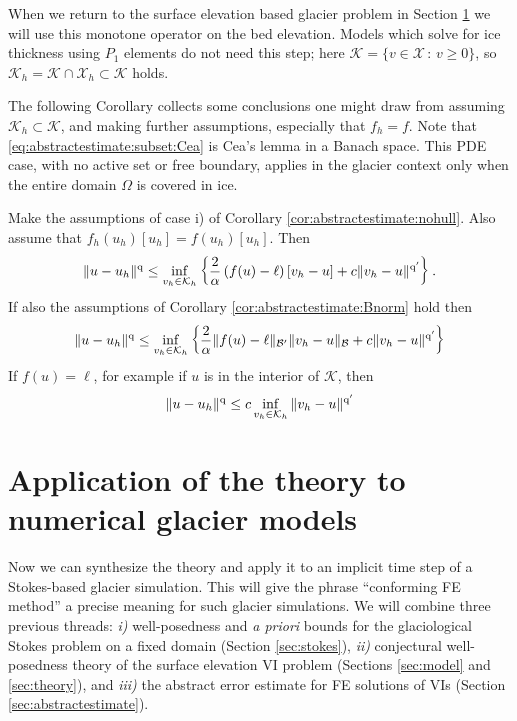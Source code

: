 \documentclass[hidelinks,onefignum,onetabnum,final]{siamart220329}  %
\newcommand{\cB}{\mathcal{B}}
\newcommand{\cK}{\mathcal{K}}
\newcommand{\cX}{\mathcal{X}}
\newcommand{\qq}{{\text{\textnormal{q}}}}
\begin{document}
When we return to the surface elevation based glacier problem in Section \ref{sec:application} we will use this monotone operator on the bed elevation.  Models which solve for ice thickness using $P_1$ elements do not need this step; here $\cK = \{v\in\cX\,:\,v\ge 0\}$, so $\cK_h=\cK\cap\cX_h \subset \cK$ holds.

The following Corollary collects some conclusions one might draw from assuming $\cK_h \subset \cK$, and making further assumptions, especially that $f_h=f$.  Note that \eqref{eq:abstractestimate:subset:Cea} is Cea's lemma \cite[Theorem 2.4.1]{Ciarlet2002} in a Banach space.  This PDE case, with no active set or free boundary, applies in the glacier context only when the entire domain $\Omega$ is covered in ice.

\begin{corollary}  \label{cor:abstractestimate:various}  Make the assumptions of case i) of Corollary \ref{cor:abstractestimate:nohull}.  Also assume that $f_h(u_h)[u_h] = f(u_h)[u_h]$.  Then
\begin{equation}
\|u-u_h\|^\qq \le  \inf_{v_h\in\cK_h} \left\{\frac{2}{\alpha} \left(f(u)-\ell\right)[v_h-u] + c \|v_h - u\|^{\qq'}\right\}. \label{eq:abstractestimate:subset}
\end{equation}
If also the assumptions of Corollary \ref{cor:abstractestimate:Bnorm} hold then
\begin{equation}
\|u-u_h\|^\qq \le \inf_{v_h\in\cK_h} \left\{\frac{2}{\alpha} \|f(u)-\ell\|_{\cB'} \|v_h-u\|_{\cB} + c \|v_h-u\|^{\qq'}\right\} \label{eq:abstractestimate:subset:Bnorm}
\end{equation}
If $f(u)=\ell$, for example if $u$ is in the interior of $\cK$, then
\begin{equation}
\|u-u_h\|^\qq \le c \inf_{v_h\in\cK_h} \|v_h-u\|^{\qq'} \label{eq:abstractestimate:subset:Cea}
\end{equation}
\end{corollary}


\section{Application of the theory to numerical glacier models} \label{sec:application}

Now we can synthesize the theory and apply it to an implicit time step of a Stokes-based glacier simulation.  This will give the phrase ``conforming FE method'' a precise meaning for such glacier simulations.  We will combine three previous threads: \emph{i)} well-posedness and \emph{a priori} bounds for the glaciological Stokes problem on a fixed domain (Section \ref{sec:stokes}), \emph{ii)} conjectural well-posedness theory of the surface elevation VI problem (Sections \ref{sec:model} and \ref{sec:theory}), and \emph{iii)} the abstract error estimate for FE solutions of VIs (Section \ref{sec:abstractestimate}).
\end{document}
